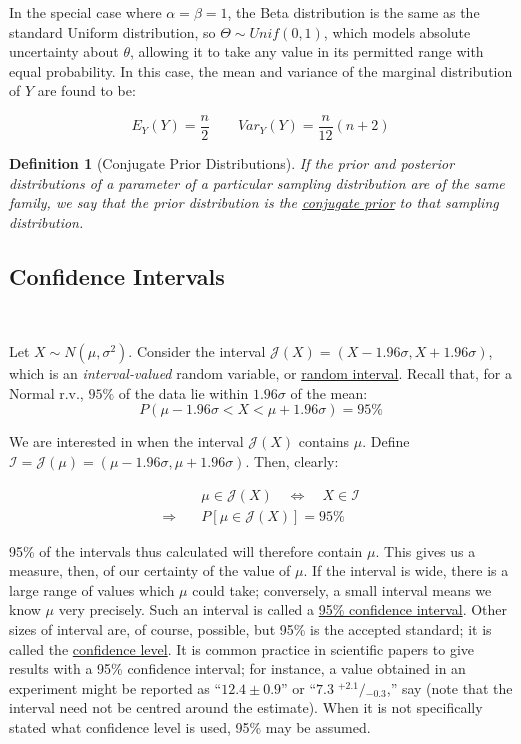 \documentclass[12pt,a4paper]{article}
\newtheorem{defn}[thm]{Definition}
\begin{document}
In the special case where $\alpha = \beta = 1$, the Beta distribution is the same as the standard Uniform distribution, so $\Theta \sim Unif(0,1)$, which models absolute uncertainty about $\theta$, allowing it to take any value in its permitted range with equal probability. In this case, the mean and variance of the marginal distribution of $Y$ are found to be:

$$E_Y(Y) = \frac{n}{2} \qquad Var_Y(Y) = \frac{n}{12}(n+2)$$

\begin{defn}[Conjugate Prior Distributions]\vspace{1cm}

If the prior and posterior distributions of a parameter of a particular sampling distribution are of the same family, we say that the prior distribution is the \underline{conjugate prior} to that sampling distribution.

\end{defn}

\subsection{Confidence Intervals}$\;$

Let $X \sim N(\mu,\sigma^2)$. Consider the interval $\mathscr{J}(X) = (X-1.96\sigma,X+1.96\sigma)$, which is an \emph{interval-valued} random variable, or \underline{random interval}. Recall that, for a Normal r.v., $95\%$ of the data lie within $1.96\sigma$ of the mean:
$$P(\mu-1.96\sigma < X < \mu+1.96\sigma) = 95\%$$

We are interested in when the interval $\mathscr{J}(X)$ contains $\mu$. Define $\mathcal{I}=\mathscr{J}(\mu) = (\mu-1.96\sigma,\mu+1.96\sigma)$. Then, clearly:

\begin{align*}
&\mu \in \mathscr{J}(X) \quad \Leftrightarrow\quad X \in \mathcal{I}\\
\Rightarrow\quad &P[\mu\in \mathscr{J}(X)] = 95\%
\end{align*}

95\% of the intervals thus calculated will therefore contain $\mu$. This gives us a measure, then, of our certainty of the value of $\mu$. If the interval is wide, there is a large range of values which $\mu$ could take; conversely, a small interval means we know $\mu$ very precisely. Such an interval is called a \underline{95\% confidence interval}. Other sizes of interval are, of course, possible, but 95\% is the accepted standard; it is called the \underline{confidence level}. It is common practice in scientific papers to give results with a 95\% confidence interval; for instance, a value obtained in an experiment might be reported as ``$12.4 \pm 0.9$'' or ``$7.3\; {}^{+2.1}\!\!/\!\!{}_{-0.3}$,'' say (note that the interval need not be centred around the estimate). When it is not specifically stated what confidence level is used, 95\% may be assumed.
\end{document}
